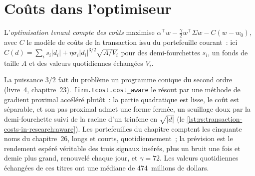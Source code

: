 \begin{omfigure}

\label{fig:rs:transaction-costs-in-research:fills}
\end{omfigure}

\section{Coûts dans l'optimiseur}

\begin{definition}\label{def:rs:transaction-costs-in-research:aware}
L'\emph{optimisation tenant compte des coûts} maximise $\alpha^\top w - \frac\gamma2 w^\top\Sigma w - C(w - w_0)$, avec $C$ le modèle de coûts de la transaction
issu du portefeuille courant~: ici $C(d) = \sum_i s_i\lvert d_i\rvert + \eta\sigma_i\lvert d_i\rvert^{3/2}\sqrt{A/V_i}$ pour des demi-fourchettes $s_i$, un fonds de taille $A$ et des valeurs quotidiennes
échangées $V_i$.
\end{definition}

La puissance $3/2$ fait du problème un programme conique du second ordre (livre~4, chapitre~23). \texttt{firm.tcost.cost\_aware} le résout par une méthode de gradient proximal accéléré
plutôt~: la partie quadratique est lisse, le coût est séparable, et son pas proximal admet une forme fermée, un seuillage doux par la demi-fourchette suivi de la racine
d'un trinôme en $\sqrt{\lvert d\rvert}$ (le \cref{lst:rs:transaction-costs-in-research:aware}). Les portefeuilles du chapitre comptent les cinquante noms du chapitre~26, longs et courts, quotidiennement~; la
prévision est le rendement espéré véritable des trois signaux insérés, plus un bruit une fois et demie plus grand, renouvelé chaque jour, et $\gamma = 72$. Les valeurs quotidiennes
échangées de ces titres ont une médiane de 474~millions de dollars.

